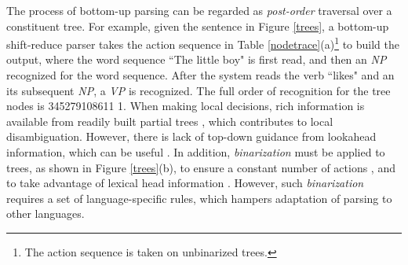\documentclass[11pt,letterpaper]{article}
\begin{document}
The process of bottom-up parsing can be regarded as \textit{post-order} traversal over a constituent tree.
For example, given the sentence in Figure \ref{trees}, a bottom-up shift-reduce parser takes the action sequence in Table \ref{nodetrace}(a)\footnote{The action sequence is taken on unbinarized trees.} to build the output, where the word sequence ``The little boy" is first read, and then an \textit{NP} recognized for the word sequence.
After the system reads the verb ``likes" and an its subsequent \textit{NP}, a \textit{VP} is recognized.
The full order of recognition for the tree nodes is \textcircled{\scriptsize{3}}\textcircled{\scriptsize{4}}\textcircled{\scriptsize{5}}\textcircled{\scriptsize{2}}\textcircled{\scriptsize{7}}\textcircled{\scriptsize{9}}\textcircled{\scriptsize{10}}\textcircled{\scriptsize{8}}\textcircled{\scriptsize{6}}\textcircled{\scriptsize{11}} \textcircled{\scriptsize{1}}.
When making local decisions, rich information is available from readily built partial trees \cite{zhu:2013,watanabe:2015,cross:2016}, which contributes to local disambiguation.
However, there is lack of top-down guidance from lookahead information, which can be useful \cite{johnson:1998,roark:1999,charniak:2000,liu:2017}.
In addition, \textit{binarization} must be applied to trees, as shown in Figure \ref{trees}(b), to ensure a constant number of actions \cite{sagae:2005}, and to take advantage of lexical head information \cite{collins:2003}.
However, such \textit{binarization} requires a set of language-specific rules, which hampers adaptation of parsing to other languages.
\end{document}
